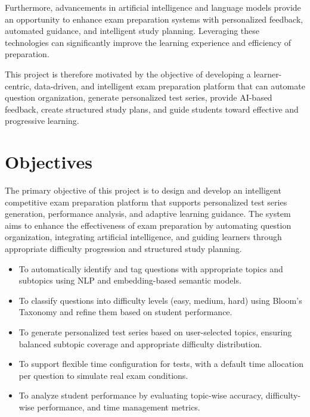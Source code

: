 \begin{sloppypar}
Furthermore, advancements in artificial intelligence and language models provide an opportunity to enhance exam preparation systems with personalized feedback, automated guidance, and intelligent study planning. Leveraging these technologies can significantly improve the learning experience and efficiency of preparation.

This project is therefore motivated by the objective of developing a learner-centric, data-driven, and intelligent exam preparation platform that can automate question organization, generate personalized test series, provide AI-based feedback, create structured study plans, and guide students toward effective and progressive learning.

\section{Objectives}

The primary objective of this project is to design and develop an intelligent competitive exam preparation platform that supports personalized test series generation, performance analysis, and adaptive learning guidance. The system aims to enhance the effectiveness of exam preparation by automating question organization, integrating artificial intelligence, and guiding learners through appropriate difficulty progression and structured study planning.


\begin{itemize}
    
    \item To automatically identify and tag questions with appropriate topics and subtopics using NLP and embedding-based semantic models.

    \item To classify questions into difficulty levels (easy, medium, hard) using Bloom's Taxonomy and refine them based on student performance.

    \item To generate personalized test series based on user-selected topics, ensuring balanced subtopic coverage and appropriate difficulty distribution.

    \item To support flexible time configuration for tests, with a default time allocation per question to simulate real exam conditions.

    \item To analyze student performance by evaluating topic-wise accuracy, difficulty-wise performance, and time management metrics.


\end{itemize}
\end{sloppypar}
